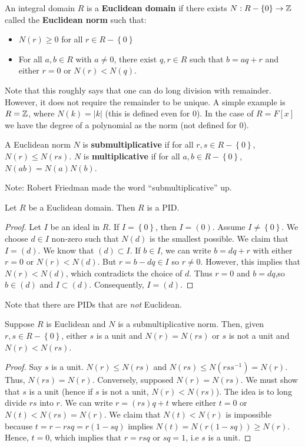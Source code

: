 \documentclass{../mathnotes}
\begin{document}
\begin{defn}
    An integral domain $R$ is a \textbf{Euclidean domain} if there exists $N:R-\left\{ 0 \right\}\to\mathbb{Z}$
    called the \textbf{Euclidean norm} such that:
    \begin{itemize}
        \item $N(r)\geq0$ for all $r\in R-\left\{ 0 \right\}$
        \item For all $a,b\in R$ with $a\neq 0$, there exist $q,r\in R$ such that $b=aq+r$ and either
            $r=0$ or $N(r)<N(q)$.
    \end{itemize}
\end{defn}

Note that this roughly says that one can do long division with remainder. However, it does not require the remainder to be unique.
A simple example is $R=\mathbb{Z}$, where $N(k)=|k|$ (this is defined even for 0). In the case of $R=F[x]$ we have the degree of a polynomial
as the norm (not defined for 0).

\begin{defn}
    A Euclidean norm $N$ is \textbf{submultiplicative} if for all $r,s\in R-\left\{ 0 \right\}$, $N(r)\leq N(rs)$.
    $N$ is \textbf{multiplicative} if for all $a,b\in R-\left\{ 0 \right\}$, $N(ab)=N(a)N(b)$.
\end{defn}
Note: Robert Friedman made the word ``submultiplicative'' up.

\begin{thm}
    Let $R$ be a Euclidean domain. Then $R$ is a PID.
\end{thm}
\begin{proof}
    Let $I$ be an ideal in $R$. If $I=\left\{ 0 \right\}$, then $I=(0)$. Assume $I\neq\left\{ 0 \right\}$.
    We choose $d\in I$ non-zero such that $N(d)$ is the smallest possible. We claim that $I=(d)$. We know that
    $(d)\subset I$. If $b\in I$, we can write $b=dq+r$ with either $r=0$ or $N(r)<N(d)$. But $r=b-dq\in I$
    so $r\neq 0$. However, this implies that $N(r)<N(d)$, which contradicts the choice of $d$. Thus $r=0$
    and $b=dq$,so $b\in(d)$ and $I\subset(d)$. Consequently, $I=(d)$.
\end{proof}

Note that there are PIDs that are \textit{not} Euclidean.

\begin{lem}
    Suppose $R$ is Euclidean and $N$ is a submultiplicative norm. Then, given $r,s\in R-\left\{ 0 \right\}$, either $s$ is a unit
    and $N(r)=N(rs)$ or $s$ is not a unit and $N(r)<N(rs)$.
\end{lem}
\begin{proof}
    Say $s$ is a unit. $N(r)\leq N(rs)$ and $N(rs)\leq N(rs s^{-1})=N(r)$. Thus, $N(rs)=N(r)$. Conversely, supposed $N(r)=N(rs)$.
    We must show that $s$ is a unit (hence if $s$ is not a unit, $N(r)<N(rs)$). The idea is to long divide $rs$ into $r$.
    We can write $r=(rs)q+t$ where either $t=0$ or $N(t)<N(rs)=N(r)$. We claim that $N(t)<N(r)$ is impossible because
    $t=r-rsq=r(1-sq)$ implies $N(t)=N(r(1-sq))\geq N(r)$. Hence, $t=0$, which implies that $r=rsq$ or $sq=1$, i.e $s$ is a unit.
\end{proof}
\end{document}
